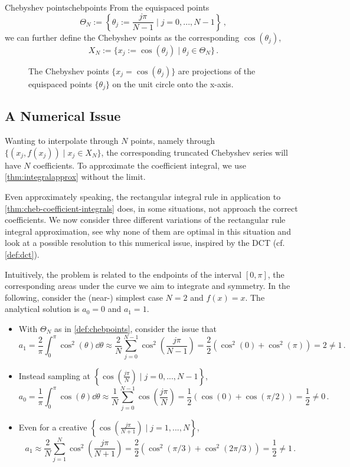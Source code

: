 \documentclass[12pt, a4paper]{article}
\begin{document}
  \begin{definition}{Chebyshev points}{chebpoints}
    From the equispaced points
    $$\Theta_N := \left\{\theta_j := \frac{j\pi}{N-1} \;\bigg|\; j = 0, ..., N-1\right\} \,,$$
    we can further define the Chebyshev points as the corresponding $\cos(\theta_j)$,
    $$X_N := \{x_j := \cos(\theta_j) \;|\; \theta_j \in \Theta_N\} \,.$$
  \end{definition}

  \begin{figure}[H]
    \centering
    \caption{The Chebyshev points $\{x_j = \cos(\theta_j)\}$ are projections of the equispaced points $\{\theta_j\}$ on the unit circle onto the x-axis.}
    \label{fig:chebpoints}
  \end{figure}

  \subsection{A Numerical Issue}
  Wanting to interpolate through $N$ points, namely through $\{(x_j, f(x_j)) \;|\; x_j \in X_N\}$, the corresponding truncated Chebyshev series will have $N$ coefficients. To approximate the coefficient integral, we use \cref{thm:integralapprox} without the limit.

  Even approximately speaking, the rectangular integral rule in application to \cref{thm:cheb-coefficient-integrals} does, in some situations, not approach the correct coefficients.
  We now consider three different variations of the rectangular rule integral approximation, see why none of them are optimal in this situation and look at a possible resolution to this numerical issue, inspired by the DCT (cf. \cref{def:dct}).

  Intuitively, the problem is related to the endpoints of the interval $[0, \pi]$, the corresponding areas under the curve we aim to integrate and symmetry.
  In the following, consider the (near-) simplest case $N = 2$ and $f(x) = x$.
  The analytical solution is $a_0 = 0$ and $a_1 = 1$.

  \begin{itemize}
    \item With $\Theta_N$ as in \cref{def:chebpoints}, consider the issue that
          $$a_1 = \frac{2}{\pi} \int_{0}^{\pi} \cos^2(\theta) \dd\theta \approx \frac{2}{N} \sum_{j=0}^{N-1} \cos^2\left(\frac{j \pi}{N-1}\right) = \frac{2}{2} \left(\cos^2(0) + \cos^2(\pi)\right) = 2 \neq 1 \,.$$
    \item Instead sampling at $\left\{\cos\left(\frac{j\pi}{N}\right) \;\big|\; j = 0, ..., N-1\right\}$,
          $$a_0 = \frac{1}{\pi} \int_0^\pi \cos(\theta) \dd\theta \approx \frac{1}{N} \sum_{j=0}^{N-1} \cos(\frac{j\pi}{N}) = \frac{1}{2} \left(\cos(0) + \cos(\pi/2)\right) = \frac{1}{2} \neq 0 \,.$$
    \item Even for a creative $\left\{\cos\left(\frac{j\pi}{N+1}\right) \;\big|\; j = 1, ..., N\right\}$,
          $$a_1 \approx \frac{2}{N} \sum_{j=1}^{N} \cos^2\left(\frac{j \pi}{N+1}\right) = \frac{2}{2} \left(\cos^2(\pi/3) + \cos^2(2\pi/3)\right) = \frac{1}{2} \neq 1 \,.$$
  \end{itemize}
\end{document}
